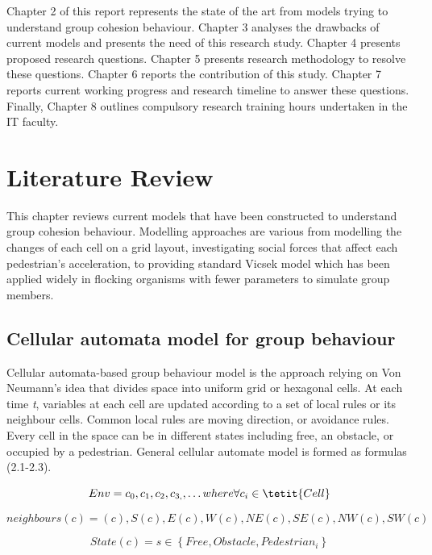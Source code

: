 \documentclass[a4paper,11pt,phdthesis,singlespace,twoside]{cssethesis}
\begin{document}
Chapter 2 of this report represents the state of the art from models trying to understand group cohesion behaviour. Chapter 3 analyses the drawbacks of current models and presents the need of this research study. Chapter 4 presents proposed research questions. Chapter 5 presents research methodology to resolve these questions. Chapter 6 reports the contribution of this study. Chapter 7 reports current working progress and research timeline to answer these questions. Finally, Chapter 8 outlines compulsory research training hours undertaken in the IT faculty.

\chapter{Literature Review}

This chapter reviews current models that have been constructed to understand group cohesion behaviour. Modelling approaches are various from modelling the changes of each cell on a grid layout, investigating social forces that affect each pedestrian’s acceleration, to providing standard Vicsek model which has been applied widely in flocking organisms with fewer parameters to simulate group members.

\section{Cellular automata model for group behaviour}
Cellular automata-based group behaviour model is the approach relying on Von Neumann’s idea that divides space into uniform grid or hexagonal cells. At each time \textit{t}, variables at each cell are updated according to a set of local rules or its neighbour cells. Common local rules are moving direction, or avoidance rules. Every cell in the space can be in different states including free, an obstacle, or occupied by a pedestrian. General cellular automate model is formed as formulas (2.1-2.3).

\begin{equation}
Env = c_{0},c_{1},c_{2},c_{3,},\ldots where\/ \forall c_{i} \in \tetit{Cell}
\end{equation}

\begin{equation}
neighbours(c) = {(c),S(c),E(c),W(c),NE(c),SE (c),NW(c),SW(c)}
\end{equation}

\begin{equation}
State(c)= s \in \left \{Free,Obstacle,Pedestrian_{i}\right \}
\end{equation}
\end{document}
